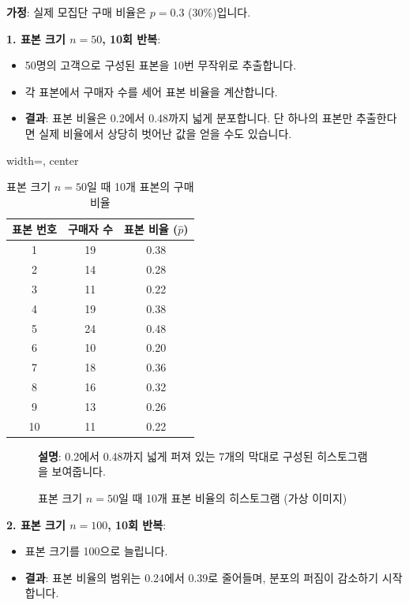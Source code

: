 \documentclass[11pt,a4paper]{article}
\theoremstyle{definition}
\begin{document}
\begin{examplebox}
\textbf{가정}: 실제 모집단 구매 비율은 $p = 0.3$ (30\%)입니다.

\textbf{1. 표본 크기 $n=50$, 10회 반복}:
\begin{itemize}
    \item 50명의 고객으로 구성된 표본을 10번 무작위로 추출합니다.
    \item 각 표본에서 구매자 수를 세어 표본 비율을 계산합니다.
    \item \textbf{결과}: 표본 비율은 0.2에서 0.48까지 넓게 분포합니다. 단 하나의 표본만 추출한다면 실제 비율에서 상당히 벗어난 값을 얻을 수도 있습니다.
\end{itemize}

\begin{table}[h!]
\centering
\caption{표본 크기 $n=50$일 때 10개 표본의 구매 비율}
\label{tab:sample_proportions_n50}
\begin{adjustbox}{width=\textwidth, center}
\begin{tabular}{ccc}
\toprule
\textbf{표본 번호} & \textbf{구매자 수} & \textbf{표본 비율 ($\hat{p}$)} \\
\midrule
1 & 19 & 0.38 \\
2 & 14 & 0.28 \\
3 & 11 & 0.22 \\
4 & 19 & 0.38 \\
5 & 24 & 0.48 \\
6 & 10 & 0.20 \\
7 & 18 & 0.36 \\
8 & 16 & 0.32 \\
9 & 13 & 0.26 \\
10 & 11 & 0.22 \\
\bottomrule
\end{tabular}
\end{adjustbox}
\end{table}

\begin{figure}[h!]
    \centering
    \caption{표본 크기 $n=50$일 때 10개 표본 비율의 히스토그램 (가상 이미지)}
    \label{fig:hist_prop_n50}
    \textbf{설명}: 0.2에서 0.48까지 넓게 퍼져 있는 7개의 막대로 구성된 히스토그램을 보여줍니다.
\end{figure}

\textbf{2. 표본 크기 $n=100$, 10회 반복}:
\begin{itemize}
    \item 표본 크기를 100으로 늘립니다.
    \item \textbf{결과}: 표본 비율의 범위는 0.24에서 0.39로 줄어들며, 분포의 퍼짐이 감소하기 시작합니다.
\end{itemize}


\end{examplebox}
\end{document}
